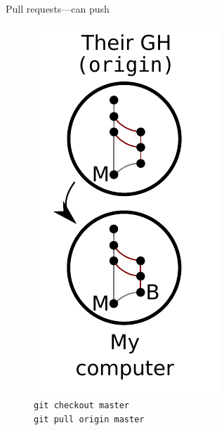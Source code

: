 \begin{frame}{Pull requests---can push}
  \begin{figure}
    \includegraphics{push_013.pdf}
    \\ \texttt{git checkout master}
    \\ \texttt{git pull origin master}
  \end{figure}
\end{frame}

